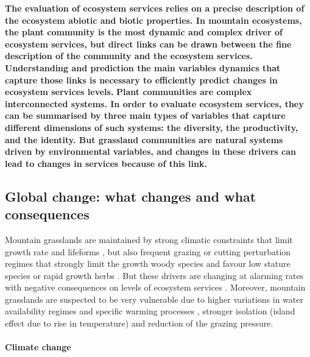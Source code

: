 %




\textbf{The evaluation of ecosystem services relies on a precise description of the ecosystem abiotic and biotic properties. In mountain ecosystems, the plant community is the most dynamic and complex driver of ecosystem services, but direct links can be drawn between the fine description of the community and the ecosystem services. Understanding and prediction the main variables dynamics that capture those links is necessary to efficiently predict changes in ecosystem services levels.}
\textbf{Plant communities are complex interconnected systems. In order to evaluate ecosystem services, they can be summarised by three main types of variables that capture different dimensions of such systems: the diversity, the productivity, and the identity. But grassland communities are natural systems driven by environmental variables, and changes in these drivers can lead  to changes in services because of this link.}



\subsection{Global change: what changes and what consequences}

Mountain grasslands are maintained by strong climatic constraints that limit growth rate and lifeforms  \parencite{koorner_alpine_2003}, but also frequent grazing or cutting perturbation regimes that strongly limit the growth woody species and favour low stature species or rapid growth herbs \parencite{diaz_plant_2007}. But these drivers are changing at alarming rates with negative consequences on levels of ecosystem services \cite{schroter_ecosystem_2005}. Moreover, mountain grasslands are suspected to be very vulnerable \parencite{schroter_ecosystem_2005, engler_21st_2011} due to higher variations in water availability regimes and specific warming processes \parencite{mountain_research_initiative_edw_working_group_elevation-dependent_2015}, stronger isolation (island effect due to rise in temperature) and reduction of the grazing pressure.

\paragraph{Climate change}

